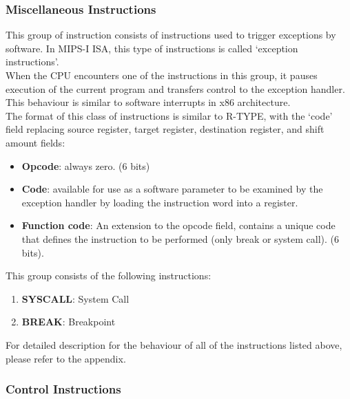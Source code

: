 \documentclass[]{scrartcl}
\begin{document}
\subsubsection{Miscellaneous Instructions}

This group of instruction consists of instructions used to trigger
exceptions by software. In MIPS-I ISA, this type of instructions is
called `exception instructions'.\\

When the CPU encounters one of the instructions in this group,
it pauses execution of the current program and transfers control
to the exception handler. This behaviour is similar to
software interrupts in x86 architecture.\\

The format of this class of instructions is similar to R-TYPE,
with the `code' field replacing source register,
target register, destination register, and shift amount fields:

\begin{itemize}

\item \textbf{Opcode}: always zero. (6 bits)

\item \textbf{Code}: available for use as a software parameter to be
                     examined by the exception handler by loading
                     the instruction word into a register.

\item \textbf{Function code}: An extension to the opcode field, contains
                              a unique code that defines the instruction
                              to be performed (only break or system call).
                              (6 bits).

\end{itemize}

This group consists of the following instructions:

\begin{enumerate}

\item \textbf{SYSCALL}: System Call
\item \textbf{BREAK}:   Breakpoint

\end{enumerate}

For detailed description for the behaviour of all of the instructions listed
above, please refer to the appendix.

\subsubsection{Control Instructions}
\end{document}
